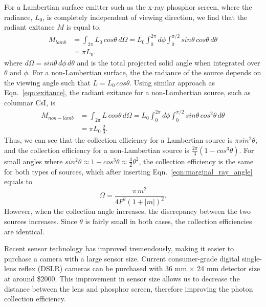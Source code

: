 For a Lambertian surface emitter such as the x-ray phosphor screen, where the radiance, $L_0$, is completely independent of viewing direction, we find that the radiant exitance $M$ is equal to,
%
\begin{equation}
\begin{aligned}
M_{lamb} & = \int_{2\pi} L_0 \, cos \theta \, d\Omega = L_0 \int_0^{2 \pi} d\phi \int_0^{\pi/2} sin \theta \, cos \theta \, d\theta \\
  & = \pi L_0.
\label{eqn:exitance}
\end{aligned}
\end{equation}
%
where $d\Omega = sin \theta \, d\phi \, d\theta$ and is the total projected solid angle when integrated over $\theta$ and $\phi$.  For a non-Lambertian surface, the the radiance of the source depends on the viewing angle such that $L = L_0 \, cos \theta $.  Using similar approach as Eqn.~\ref{eqn:exitance}, the radiant exitance for a non-Lambertian source, such as columnar CsI, is
%
\begin{equation}
\begin{aligned}
M_{non-lamb} & = \int_{2 \pi} L \, cos\theta \, d\Omega = L_0 \int_0^{2 \pi} d\phi \int_0^{\pi/2} sin\theta \, cos^2 \theta \, d\theta \\
    & = \pi L_0 \, \frac{2}{3}.
\end{aligned}
\end{equation}
%
Thus, we can see that the collection efficiency for a Lambertian source is $\pi sin^2 \theta$, and the collection efficiency for a non-Lambertian source is $\frac{2 \pi}{3} (1-cos^3 \theta)$.  For small angles where $sin^2 \theta \approx 1 - cos^3 \theta \approx \frac{3}{2}\theta^2$, the collection efficiency is the same for both types of sources, which after inserting Eqn.~\ref{eqn:marginal_ray_angle} equals to
\begin{equation}
\Omega = \frac{\pi \, m^2}{4 F^2 (1 + \lvert m \vert )^2}.
\end{equation}
However, when the collection angle increases, the discrepancy between the two sources increases.  Since $\theta$ is fairly small in both cases, the collection efficiencies are identical.

Recent sensor technology has improved tremendously, making it easier to purchase a camera with a large sensor size.  Current consumer-grade digital single-lens reflex (DSLR) cameras can be purchased with 36 mm $\times$ 24 mm detector size at around \$2000.  This improvement in sensor size allows us to decrease the distance between the lens and phosphor screen, therefore improving the photon collection efficiency.

